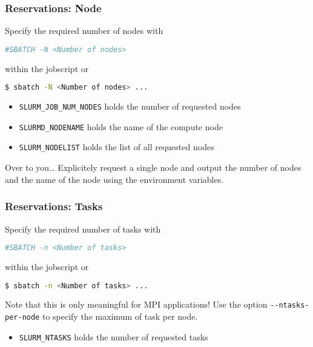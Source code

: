 \begin{frame}[fragile]
  \frametitle{Reservations: Node}
  Specify the required number of nodes with
\begin{lstlisting}[language=Bash,style=Shell]
#SBATCH -N <Number of nodes>
\end{lstlisting}
within the jobscript or
\begin{lstlisting}[language=Bash,style=Shell]
$ sbatch -N <Number of nodes> ...
\end{lstlisting}
\begin{itemize}
\item \verb+SLURM_JOB_NUM_NODES+ holds the number of requested nodes
\item \verb+SLURMD_NODENAME+ holds the name of the compute node
\item \verb+SLURM_NODELIST+ holds the list of all requested nodes
\end{itemize}
\vspace{-1em}
\begin{block}{Over to you\ldots}
  Explicitely request a single node and output the number of nodes and the name 
  of the node using the environment variables.
\end{block}
  \vfill
\end{frame}

\begin{frame}[fragile]
  \frametitle{Reservations: Tasks}
 Specify the required number of tasks with
\begin{lstlisting}[language=Bash,style=Shell]
#SBATCH -n <Number of tasks>
\end{lstlisting}
within the jobscript or
\begin{lstlisting}[language=Bash,style=Shell]
$ sbatch -n <Number of tasks> ...
\end{lstlisting}
Note that this is only meaningful for MPI applications! Use the option
\verb+--ntasks-per-node+ to specify the maximum of task per node.
\begin{itemize}
\item \verb+SLURM_NTASKS+ holds the number of requested tasks
\end{itemize}
  \vfill
\end{frame}

